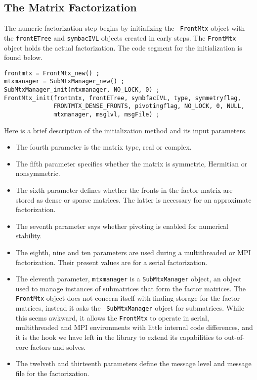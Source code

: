 \subsection{The Matrix Factorization}
\label{subsection:serial:factor}
\par
The numeric factorization step begins by initializing the {\tt
FrontMtx} object with the {\tt frontETree} and {\tt symbacIVL} 
objects created in early steps.
The {\tt FrontMtx} object holds the actual factorization.
The code segment for the initialization is found below.
\begin{verbatim}
frontmtx = FrontMtx_new() ;
mtxmanager = SubMtxManager_new() ;
SubMtxManager_init(mtxmanager, NO_LOCK, 0) ;
FrontMtx_init(frontmtx, frontETree, symbfacIVL, type, symmetryflag,
              FRONTMTX_DENSE_FRONTS, pivotingflag, NO_LOCK, 0, NULL,
              mtxmanager, msglvl, msgFile) ;
\end{verbatim}
Here is a brief description of the initialization method and its
input parameters.
\begin{itemize}
\item
The fourth parameter is the matrix type, real or complex.
\item
The fifth parameter specifies whether the matrix is symmetric,
Hermitian or nonsymmetric.
\item
The sixth parameter defines whether the fronts in the factor matrix
are stored as dense or sparse matrices.
The latter is necessary for an approximate factorization.
\item
The seventh parameter says whether pivoting is enabled for
numerical stability.
\item
The eighth, nine and ten parameters are used during a multithreaded
or MPI factorization.
Their present values are for a serial factorization.
\item
The eleventh parameter, {\tt mtxmanager} is a {\tt SubMtxManager}
object, an object used to manage instances of submatrices that form
the factor matrices.
The {\tt FrontMtx} object does not concern itself with finding
storage for the factor matrices, instead it asks the {\tt
SubMtxManager} object for submatrices.
While this seems awkward, it allows the {\tt FrontMtx} to operate 
in serial, multithreaded and MPI environments with little internal
code differences, and it is the hook we have left in the library to
extend its capabilities to out-of-core factors and solves.
\item
The twelveth and thirteenth parameters define the message level and
message file for the factorization.
\end{itemize}
